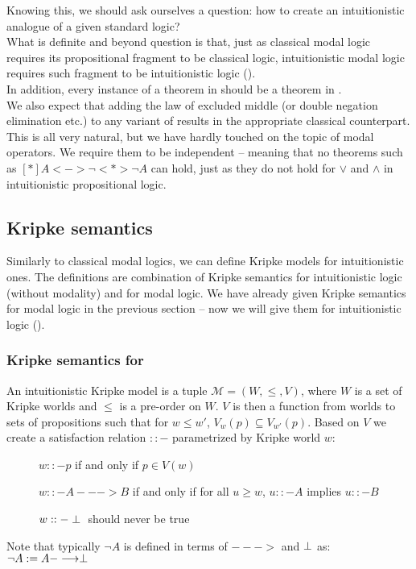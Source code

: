 Knowing this, we should ask ourselves a question: how to create an intuitionistic analogue of a given standard logic?\\
What is definite and beyond question is that, just as classical modal logic requires its propositional fragment to be classical logic, intuitionistic modal logic \IML{} requires such fragment to be intuitionistic logic (\IL{}).\\ 
In addition, every instance of a theorem in \IL{} should be a theorem in \IML{}.\\
 We also expect that adding the law of excluded middle (or double negation elimination etc.) to any variant of \IML{} results in the appropriate classical counterpart.\\

This is all very natural, but we have hardly touched on the topic of modal operators. We require them to be independent -- meaning that no theorems such as $[*]A <-> \neg <*> \neg A$ can hold, just as they do not hold for $\vee$ and $\wedge$ in intuitionistic propositional logic.\\

\subsection{Kripke semantics}

Similarly to classical modal logics, we can define Kripke models for intuitionistic ones. The definitions are combination of Kripke semantics for intuitionistic logic (without modality) and for modal logic.  We have already given Kripke semantics for modal logic in the previous section -- now we will give them for intuitionistic logic (\IL{}).

\subsubsection{Kripke semantics for \IL{}}
An intuitionistic Kripke model is a tuple $\mathcal M = (W, \leq, V)$, where $W$ is a set of Kripke worlds and $\leq$ is a pre-order on $W$. $V$ is then a function from worlds to sets of propositions such that for $w \leq w'$,  $V_w (p)\subseteq V_{w'}(p)$. Based on $V$ we create a satisfaction relation $::-$ parametrized by Kripke world $w$:
\begin{description}
\item[] $w ::- p$ if and only if $p \in V(w)$
\item[] $w ::- A ---> B$ if and only if for all $u \geq w$, $u ::- A$ implies $u ::- B$
\item[] $w ::- \perp{}$ should never be true
\end{description}
Note that typically $\neg A$ is defined in terms of $--->$ and $\perp$ as: $\neg A := A ---> \perp{}$\\

